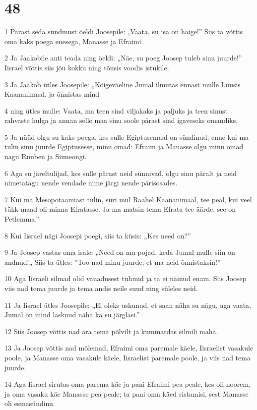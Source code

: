 \chapter{48}

\par 1 Pärast seda sündmust öeldi Joosepile: „Vaata, su isa on haige!” Siis ta võttis oma kaks poega enesega, Manasse ja Efraimi.
\par 2 Ja Jaakobile anti teada ning öeldi: „Näe, su poeg Joosep tuleb sinu juurde!” Iisrael võttis siis jõu kokku ning tõusis voodis istukile.
\par 3 Ja Jaakob ütles Joosepile: „Kõigeväeline Jumal ilmutas ennast mulle Luusis Kaananimaal, ja õnnistas mind
\par 4 ning ütles mulle: Vaata, ma teen sind viljakaks ja paljuks ja teen sinust rahvaste hulga ja annan selle maa sinu soole pärast sind igaveseks omandiks.
\par 5 Ja nüüd olgu su kaks poega, kes sulle Egiptusemaal on sündinud, enne kui ma tulin sinu juurde Egiptusesse, minu omad: Efraim ja Manasse olgu minu omad nagu Ruuben ja Siimeongi.
\par 6 Aga su järeltulijad, kes sulle pärast neid sünnivad, olgu sinu päralt ja neid nimetatagu nende vendade nime järgi nende pärisosades.
\par 7 Kui ma Mesopotaamiast tulin, suri mul Raahel Kaananimaal, tee peal, kui veel tükk maad oli minna Efratasse. Ja ma matsin tema Efrata tee äärde, see on Petlemma.”
\par 8 Kui Iisrael nägi Joosepi poegi, siis ta küsis: „Kes need on?”
\par 9 Ja Joosep vastas oma isale: „Need on mu pojad, keda Jumal mulle siin on andnud!„ Siis ta ütles: ”Too nad minu juurde, et ma neid õnnistaksin!”
\par 10 Aga Iisraeli silmad olid vanadusest tuhmid ja ta ei näinud enam. Siis Joosep viis nad tema juurde ja tema andis neile suud ning süleles neid.
\par 11 Ja Iisrael ütles Joosepile: „Ei oleks uskunud, et saan näha su nägu, aga vaata, Jumal on mind lasknud näha ka su järglasi.”
\par 12 Siis Joosep võttis nad ära tema põlvilt ja kummardas silmili maha.
\par 13 Ja Joosep võttis nad mõlemad, Efraimi oma paremale käele, Iisraelist vasakule poole, ja Manasse oma vasakule käele, Iisraelist paremale poole, ja viis nad tema juurde.
\par 14 Aga Iisrael sirutas oma parema käe ja pani Efraimi pea peale, kes oli noorem, ja oma vasaku käe Manasse pea peale; ta pani oma käed ristamisi, sest Manasse oli esmasündinu.
